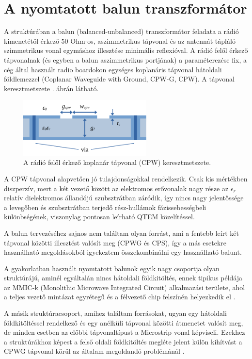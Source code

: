 \section{A nyomtatott balun transzformátor}
	A struktúrában a balun (balanced-unbalanced) transzformátor feladata a rádió kimenetétől érkező 50 Ohm-os, aszimmetrikus tápvonal és az antennát tápláló szimmetrikus vonal egymáshoz illesztése minimális reflexióval. A rádió felől érkező tápvonalnak (és egyben a balun aszimmetrikus portjának) a paraméterezése fix, a cég által használt radio boardokon egységes koplanáris tápvonal hátoldali földlemezzel (Coplanar Waveguide with Ground, CPW-G, CPW). A tápvonal keresztmetszete . ábrán látható.
\begin{figure}[h]
	\centering
	\includegraphics[width=0.6\textwidth]{kep/cpw.pdf}
	\caption{A rádió felől érkező koplanár tápvonal (CPW) keresztmetszete.}
	\label{fig:cpw}
\end{figure}
	A CPW tápvonal alapvetően jó tulajdonságokkal rendelkezik. Csak kis mértékben diszperzív, mert a két vezető között az elektromos erővonalak nagy része az $\epsilon_r$ relatív dielektromos állandójú szubsztrátban záródik, így nincs nagy jelentőssége a levegőben és szubsztrátban terjedő rész-hullámok fázissebességbeli különbségének, viszonylag pontosan leírható QTEM közelítéssel.
\par A balun tervezéséhez sajnos nem találtam olyan forrást, ami a fentebb leírt két tápvonal közötti illesztést valósít meg (CPWG és CPS), így a más esetekre használható megoldásokból igyekeztem összekombinálni egy használható balunt.
\par A gyakorlatban használt nyomtatott balunok egyik nagy csoportja olyan struktúrájú, aminél egyáltalán nincs hátoldali földkitöltés, ennek tipikus példája az MMIC-k (Monolithic Microwave Integrated Circuit) alkalmazási területe, ahol a teljes vezető mintázat egyrétegű és a félvezető chip felszínén helyezkedik el \cite{cpw-ccs, easy-balun, 0-55GHz, 0-110GHz}.
\par A másik struktúracsoport, amihez találtam forrásokat, ugyan egy hátoldali földkitöltéssel rendelkező és egy anélküli tápvonal közötti átmenetet valósít meg, de minden esetben az előbbi tápvonaltípust a Microstrip vonal képviseli. Ezekhez a struktúrákhoz képest a felső oldali földkitöltés megléte jelent külön kihítvást a CPWG tápvonal körül az általam megoldandó problémánál \cite{cpw-ccs, uwb-ms-cps, conv-balun-1, conv-balun-2, wb-cps-ms}.
